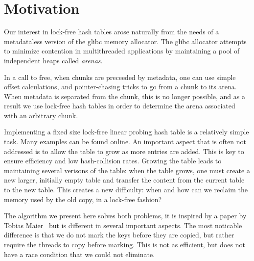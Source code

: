 \section{Motivation}
\label{sec:intro}

Our interest in lock-free hash tables arose naturally from the needs
of a metadataless version of the glibc memory allocator.  The glibc
allocator attempts to minimize contention in multithreaded
applications by maintaining a pool of independent heaps called \emph{arenas}.

In a call to free, when chunks are preceeded by metadata, one can use
simple offset calculations, and pointer-chasing tricks to go from a
chunk to its arena. When metadata is separated from the chunk,
this is no longer possible, and as a result we use lock-free hash
tables in order to determine the arena associated with an arbitrary
chunk.

Implementing a fixed size lock-free linear probing hash table is a
relatively simple task. Many examples can be found online. An
important aspect that is often not addressed is to allow the table to
grow as more entries are added. This is key to ensure efficiency and
low hash-collision rates. Growing the table leads to maintaining
several verisons of the table: when the table grows, one must create a
new larger, initially empty table and transfer the content from the
current table to the new table. This creates a new difficulty: when
and how can we reclaim the memory used by the old copy, in a lock-free
fashion?

The algorithm we present here solves both problems,
it is inspired by a paper by Tobias Maier~\cite{MaierSD16}
but is different in several important aspects. The most noticable difference
is that we do not mark the keys before they are copied, but rather require the
threads to copy before marking. This is not as efficient, but does not have
a race condition that we could not eliminate.




